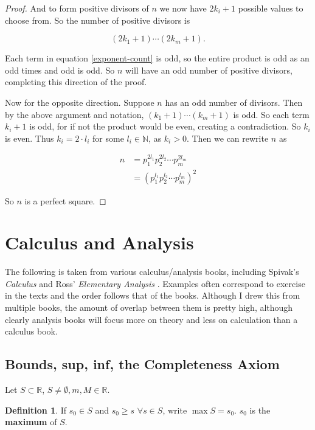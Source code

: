 \documentclass{article}
\theoremstyle{definition}
\newtheorem{definition}{Definition}[section]
\begin{document}
\begin{proof}
And to form positive divisors of $n$ we now have $2k_i + 1$ possible values to choose from. So the number of positive divisors is

\begin{equation} \label{exponent-count}
(2k_1 + 1) \cdots (2k_m + 1).
\end{equation}

Each term in equation \ref{exponent-count} is odd, so the entire product is odd as an odd times and odd is odd. So $n$ will have an odd number of positive divisors, completing this direction of the proof.

Now for the opposite direction. Suppose $n$ has an odd number of divisors. Then by the above argument and notation, $(k_1 + 1) \cdots (k_m + 1)$ is odd. So each term $k_i + 1$ is odd, for if not the product would be even, creating a contradiction. So $k_i$ is even. Thus $k_i = 2 \cdot l_i$ for some $l_i \in \mathbb{N}$, as $k_i > 0$. Then we can rewrite $n$ as

\begin{align*}
n &= p_1^{2l_1} p_2^{2l_2} \cdots p_m^{2l_m}  \\
&= \left(p_1^{l_1} p_2^{l_2} \cdots p_m^{l_m} \right)^2
\end{align*}

So $n$ is a perfect square.

\end{proof}

\section{Calculus and Analysis}

The following is taken from various calculus/analysis books, including Spivak's {\it Calculus} \cite{spivak} and Ross' {\it Elementary Analysis} \cite{ross}. Examples often correspond to exercise in the texts and the order follows that of the books. Although I drew this from multiple books, the amount of overlap between them is pretty high, although clearly analysis books will focus more on theory and less on calculation than a calculus book.

\subsection{Bounds, sup, inf, the Completeness Axiom}

Let $S \subset \mathbb{R}$, $S \neq \emptyset, m, M \in \mathbb{R}$. 

\begin{definition}
If $s_0 \in S$ and $s_0 \ge s$ $\forall s \in S$, write $\max S = s_0$. $s_0$ is the \textbf{maximum} of $S$.
\end{definition}
\end{document}

